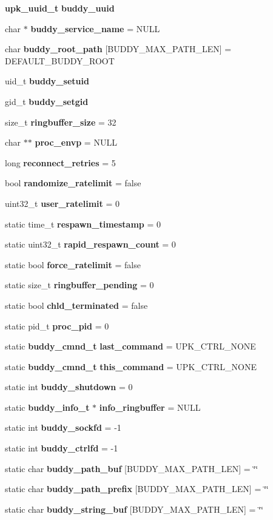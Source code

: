 \begin{DoxyCompactItemize}
\item 
{\bf upk\_\-uuid\_\-t} {\bf buddy\_\-uuid}
\item 
char $\ast$ {\bf buddy\_\-service\_\-name} = NULL
\item 
char {\bf buddy\_\-root\_\-path} [BUDDY\_\-MAX\_\-PATH\_\-LEN] = DEFAULT\_\-BUDDY\_\-ROOT
\item 
uid\_\-t {\bf buddy\_\-setuid}
\item 
gid\_\-t {\bf buddy\_\-setgid}
\item 
size\_\-t {\bf ringbuffer\_\-size} = 32
\item 
char $\ast$$\ast$ {\bf proc\_\-envp} = NULL
\item 
long {\bf reconnect\_\-retries} = 5
\item 
bool {\bf randomize\_\-ratelimit} = false
\item 
uint32\_\-t {\bf user\_\-ratelimit} = 0
\item 
static time\_\-t {\bf respawn\_\-timestamp} = 0
\item 
static uint32\_\-t {\bf rapid\_\-respawn\_\-count} = 0
\item 
static bool {\bf force\_\-ratelimit} = false
\item 
static size\_\-t {\bf ringbuffer\_\-pending} = 0
\item 
static bool {\bf chld\_\-terminated} = false
\item 
static pid\_\-t {\bf proc\_\-pid} = 0
\item 
static {\bf buddy\_\-cmnd\_\-t} {\bf last\_\-command} = UPK\_\-CTRL\_\-NONE
\item 
static {\bf buddy\_\-cmnd\_\-t} {\bf this\_\-command} = UPK\_\-CTRL\_\-NONE
\item 
static int {\bf buddy\_\-shutdown} = 0
\item 
static {\bf buddy\_\-info\_\-t} $\ast$ {\bf info\_\-ringbuffer} = NULL
\item 
static int {\bf buddy\_\-sockfd} = -\/1
\item 
static int {\bf buddy\_\-ctrlfd} = -\/1
\item 
static char {\bf buddy\_\-path\_\-buf} [BUDDY\_\-MAX\_\-PATH\_\-LEN] = \char`\"{}\char`\"{}
\item 
static char {\bf buddy\_\-path\_\-prefix} [BUDDY\_\-MAX\_\-PATH\_\-LEN] = \char`\"{}\char`\"{}
\item 
static char {\bf buddy\_\-string\_\-buf} [BUDDY\_\-MAX\_\-PATH\_\-LEN] = \char`\"{}\char`\"{}
\item 
$$
\end{DoxyCompactItemize}
